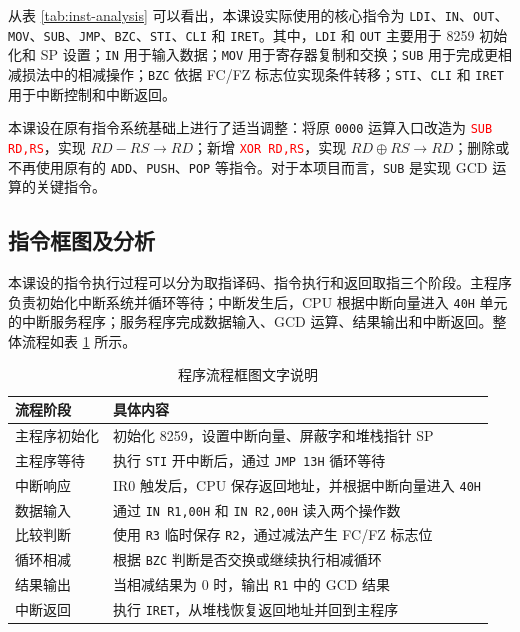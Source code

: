 \documentclass[UTF8,12pt,a4paper]{ctexart}
\newcommand{\hex}[1]{\texttt{#1H}}
\newcommand{\reg}[1]{\texttt{#1}}
\newcommand{\inst}[1]{\texttt{#1}}
\begin{document}
从表 \ref{tab:inst-analysis} 可以看出，本课设实际使用的核心指令为 \inst{LDI}、\inst{IN}、\inst{OUT}、\inst{MOV}、\inst{SUB}、\inst{JMP}、\inst{BZC}、\inst{STI}、\inst{CLI} 和 \inst{IRET}。其中，\inst{LDI} 和 \inst{OUT} 主要用于 8259 初始化和 SP 设置；\inst{IN} 用于输入数据；\inst{MOV} 用于寄存器复制和交换；\inst{SUB} 用于完成更相减损法中的相减操作；\inst{BZC} 依据 FC/FZ 标志位实现条件转移；\inst{STI}、\inst{CLI} 和 \inst{IRET} 用于中断控制和中断返回。

本课设在原有指令系统基础上进行了适当调整：将原 \texttt{0000} 运算入口改造为 \textcolor{red}{\inst{SUB RD,RS}}，实现 $RD-RS \rightarrow RD$；新增 \textcolor{red}{\inst{XOR RD,RS}}，实现 $RD \oplus RS \rightarrow RD$；删除或不再使用原有的 \inst{ADD}、\inst{PUSH}、\inst{POP} 等指令。对于本项目而言，\inst{SUB} 是实现 GCD 运算的关键指令。

\subsection{指令框图及分析}

本课设的指令执行过程可以分为取指译码、指令执行和返回取指三个阶段。主程序负责初始化中断系统并循环等待；中断发生后，CPU 根据中断向量进入 \hex{40} 单元的中断服务程序；服务程序完成数据输入、GCD 运算、结果输出和中断返回。整体流程如表 \ref{tab:flow-text} 所示。

\begin{table}[H]
\centering
\caption{程序流程框图文字说明}
\label{tab:flow-text}
\renewcommand{\arraystretch}{1.35}
\begin{tabularx}{0.95\textwidth}{
>{\centering\arraybackslash}p{3.2cm}
>{\centering\arraybackslash}X
}
\toprule
流程阶段 & 具体内容 \\
\midrule
主程序初始化 & 初始化 8259，设置中断向量、屏蔽字和堆栈指针 SP \\
主程序等待 & 执行 \inst{STI} 开中断后，通过 \inst{JMP 13H} 循环等待 \\
中断响应 & IR0 触发后，CPU 保存返回地址，并根据中断向量进入 \hex{40} \\
数据输入 & 通过 \inst{IN R1,00H} 和 \inst{IN R2,00H} 读入两个操作数 \\
比较判断 & 使用 \reg{R3} 临时保存 \reg{R2}，通过减法产生 FC/FZ 标志位 \\
循环相减 & 根据 \inst{BZC} 判断是否交换或继续执行相减循环 \\
结果输出 & 当相减结果为 0 时，输出 \reg{R1} 中的 GCD 结果 \\
中断返回 & 执行 \inst{IRET}，从堆栈恢复返回地址并回到主程序 \\
\bottomrule
\end{tabularx}
\end{table}
\end{document}
